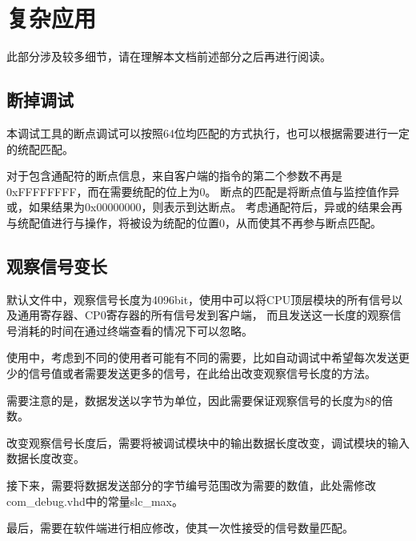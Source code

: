 \section{复杂应用}
    此部分涉及较多细节，请在理解本文档前述部分之后再进行阅读。
    \subsection{断掉调试}
        本调试工具的断点调试可以按照64位均匹配的方式执行，也可以根据需要进行一定的统配匹配。

        对于包含通配符的断点信息，来自客户端的指令的第二个参数不再是0xFFFFFFFF，而在需要统配的位上为0。%
        断点的匹配是将断点值与监控值作异或，如果结果为0x00000000，则表示到达断点。%
        考虑通配符后，异或的结果会再与统配值进行与操作，将被设为统配的位置0，从而使其不再参与断点匹配。

    \subsection{观察信号变长}
        默认文件中，观察信号长度为4096bit，使用中可以将CPU顶层模块的所有信号以及通用寄存器、CP0寄存器的所有信号发到客户端，
        而且发送这一长度的观察信号消耗的时间在通过终端查看的情况下可以忽略。

        使用中，考虑到不同的使用者可能有不同的需要，比如自动调试中希望每次发送更少的信号值或者需要发送更多的信号，在此给出改变观察信号长度的方法。

        需要注意的是，数据发送以字节为单位，因此需要保证观察信号的长度为8的倍数。

        改变观察信号长度后，需要将被调试模块中的输出数据长度改变，调试模块的输入数据长度改变。

        接下来，需要将数据发送部分的字节编号范围改为需要的数值，此处需修改com\_debug.vhd中的常量slc\_max。

        最后，需要在软件端进行相应修改，使其一次性接受的信号数量匹配。
